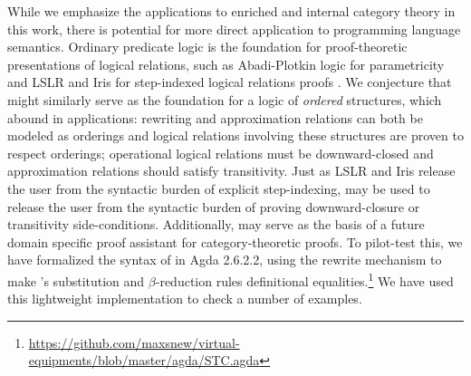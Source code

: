 \documentclass{llncs}
\begin{document}

While we emphasize the applications to enriched and internal category
theory in this work, there is potential for more direct application to
programming language semantics.
%
Ordinary predicate logic is the foundation for proof-theoretic presentations of
logical relations, such as Abadi-Plotkin logic for parametricity and
LSLR and Iris for step-indexed logical relations proofs
\cite{abadi-plotkin,lslr,iris}.
%
We conjecture that \vett{} might similarly serve as the foundation for
a logic of \emph{ordered} structures, which abound in applications:
rewriting and approximation relations can both be modeled as orderings
and logical relations involving these structures are proven to respect
orderings; operational logical relations must be downward-closed and
approximation relations should satisfy transitivity.
%
Just as LSLR and Iris release the user from the syntactic burden of
explicit step-indexing, \vett{} may be used to release the user from
the syntactic burden of proving downward-closure or transitivity
side-conditions.
%
Additionally, \vett{} may serve as the basis of a future domain specific
proof assistant for category-theoretic proofs.  To pilot-test this, we
have formalized the syntax of \vett{} in Agda 2.6.2.2, using the rewrite
mechanism to make \vett's substitution and $\beta$-reduction rules
definitional
equalities.\footnote{\url{https://github.com/maxsnew/virtual-equipments/blob/master/agda/STC.agda}}
We have used this lightweight implementation to check a number of
examples.  
\end{document}
